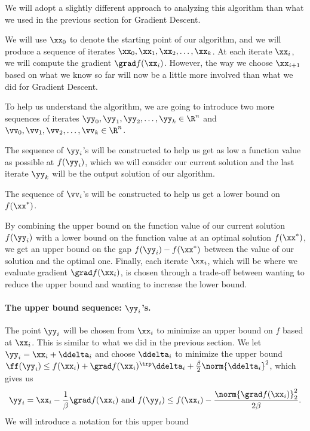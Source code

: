 
We will adopt a slightly different approach to analyzing this
algorithm than what we used in the previous section for Gradient Descent.

We will use $\xx_0$ to denote the starting point of our algorithm, and
we will produce a sequence of iterates $\xx_0, \xx_1, \xx_2, \ldots,
\xx_k $.
At each iterate $\xx_{i}$, we will compute the gradient $\grad
f(\xx_{i})$.
However, the way we choose  $\xx_{i+1}$ based on what we know so far
will now be a little more involved than what we did for Gradient Descent.

To help us understand the algorithm, we are going to introduce two
more sequences of iterates $\yy_0, \yy_1, \yy_2, \ldots,
\yy_k \in \R^n $ and $\vv_0, \vv_1, \vv_2, \ldots,
\vv_k \in \R^n$.

The sequence of $\yy_i$'s will be constructed to help us get as low a
function value as possible at $f(\yy_i)$, which we will consider our
current solution and the last iterate $\yy_k$ will be the output solution of
our algorithm.

The sequence of $\vv_i$'s will be constructed to help us get a lower
bound on $f(\xx^*)$.

By combining the upper bound on the function value of our current
solution $f(\yy_i)$ with a lower bound on the function value at an
optimal solution $f(\xx^*)$, we get an upper bound on the gap
$f(\yy_i)-f(\xx^*)$
between
the value of our solution and the optimal one.
Finally, each iterate $\xx_i$, which will be where we evaluate
gradient $\grad f(\xx_{i})$, is chosen through a trade-off between
wanting to reduce the upper bound and wanting to increase the lower bound.


\paragraph{The upper bound sequence: $\yy_i$'s.}
The point $\yy_i$ will be chosen from $\xx_i$ to minimize an upper
bound on $f$ based at $\xx_i$.
This is similar to what we did in the previous section.
We let $\yy_i = \xx_i +\ddelta_i$
and choose $\ddelta_i$ to minimize the upper bound
$ \ff(\yy_i) \leq f(\xx_{i})  + \grad f(\xx_{i})^\trp\ddelta_i
     + \frac{\beta}{2} \norm{\ddelta_i}^2$, which gives us
\[
 \yy_i = \xx_{i}-\frac{1}{\beta}\grad f(\xx_{i})
 \text{ and }
   f(\yy_i) \leq f(\xx_{i}) - \frac{\norm{\grad
                f(\xx_{i})}_2^2}{2\beta}
 .
\]
We will introduce a notation for this upper bound

